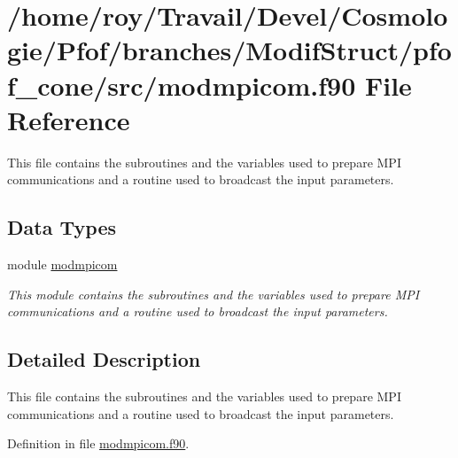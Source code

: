 \hypertarget{modmpicom_8f90}{\section{/home/roy/\-Travail/\-Devel/\-Cosmologie/\-Pfof/branches/\-Modif\-Struct/pfof\-\_\-cone/src/modmpicom.f90 File Reference}
\label{modmpicom_8f90}
}


This file contains the subroutines and the variables used to prepare M\-P\-I communications and a routine used to broadcast the input parameters.  


\subsection*{Data Types}
\begin{DoxyCompactItemize}
\item 
module \hyperlink{classmodmpicom}{modmpicom}
\begin{DoxyCompactList}\small\item\em This module contains the subroutines and the variables used to prepare M\-P\-I communications and a routine used to broadcast the input parameters. \end{DoxyCompactList}\end{DoxyCompactItemize}


\subsection{Detailed Description}
This file contains the subroutines and the variables used to prepare M\-P\-I communications and a routine used to broadcast the input parameters. 

Definition in file \hyperlink{modmpicom_8f90_source}{modmpicom.\-f90}.

